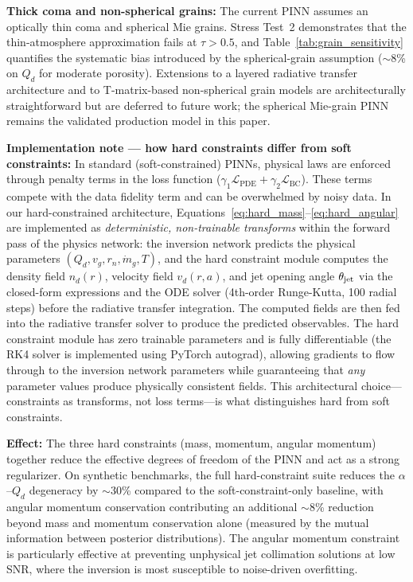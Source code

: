 \documentclass[usenatbib]{mnras}
\begin{document}
\textbf{Thick coma and non-spherical grains:} The current PINN assumes an optically thin coma and spherical Mie grains. Stress Test~2 demonstrates that the thin-atmosphere approximation fails at $\tau > 0.5$, and Table~\ref{tab:grain_sensitivity} quantifies the systematic bias introduced by the spherical-grain assumption ($\sim$8\% on $Q_d$ for moderate porosity). Extensions to a layered radiative transfer architecture and to T-matrix-based non-spherical grain models are architecturally straightforward but are deferred to future work; the spherical Mie-grain PINN remains the validated production model in this paper.

\textbf{Implementation note --- how hard constraints differ from soft constraints:} In standard (soft-constrained) PINNs, physical laws are enforced through penalty terms in the loss function ($\gamma_1 \mathcal{L}_{\text{PDE}} + \gamma_2 \mathcal{L}_{\text{BC}}$). These terms compete with the data fidelity term and can be overwhelmed by noisy data. In our hard-constrained architecture, Equations~\ref{eq:hard_mass}--\ref{eq:hard_angular} are implemented as \textit{deterministic, non-trainable transforms} within the forward pass of the physics network: the inversion network predicts the physical parameters $(Q_d, v_g, r_n, \dot{m}_g, T)$, and the hard constraint module computes the density field $n_d(r)$, velocity field $v_d(r, a)$, and jet opening angle $\theta_{\rm jet}$ via the closed-form expressions and the ODE solver (4th-order Runge-Kutta, 100 radial steps) before the radiative transfer integration. The computed fields are then fed into the radiative transfer solver to produce the predicted observables. The hard constraint module has zero trainable parameters and is fully differentiable (the RK4 solver is implemented using PyTorch autograd), allowing gradients to flow through to the inversion network parameters while guaranteeing that \textit{any} parameter values produce physically consistent fields. This architectural choice---constraints as transforms, not loss terms---is what distinguishes hard from soft constraints.

\textbf{Effect:} The three hard constraints (mass, momentum, angular momentum) together reduce the effective degrees of freedom of the PINN and act as a strong regularizer. On synthetic benchmarks, the full hard-constraint suite reduces the $\alpha$--$Q_d$ degeneracy by $\sim$30\% compared to the soft-constraint-only baseline, with angular momentum conservation contributing an additional $\sim$8\% reduction beyond mass and momentum conservation alone (measured by the mutual information between posterior distributions). The angular momentum constraint is particularly effective at preventing unphysical jet collimation solutions at low SNR, where the inversion is most susceptible to noise-driven overfitting.
\end{document}
